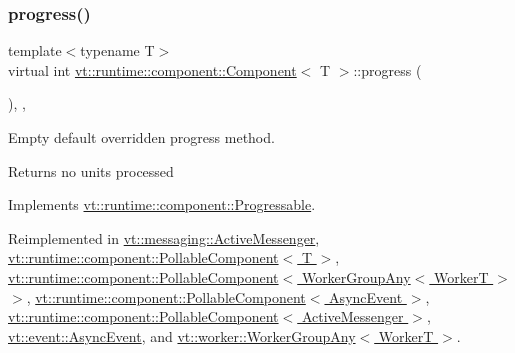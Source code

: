 \mbox{\label{structvt_1_1runtime_1_1component_1_1_component_a1dab11d9eb5bed8dfd5a3bb8fdf67f5a}} 
\subsubsection{\texorpdfstring{progress()}{progress()}}
{\footnotesize\ttfamily template$<$typename T$>$ \\
virtual int \hyperlink{structvt_1_1runtime_1_1component_1_1_component}{vt\+::runtime\+::component\+::\+Component}$<$ T $>$\+::progress (\begin{DoxyParamCaption}{ }\end{DoxyParamCaption})\hspace{0.3cm}{\ttfamily [inline]}, {\ttfamily [override]}, {\ttfamily [virtual]}}



Empty default overridden progress method. 

\begin{DoxyReturn}{Returns}
no units processed 
\end{DoxyReturn}


Implements \hyperlink{structvt_1_1runtime_1_1component_1_1_progressable_a37e883d4822db4f1effa9587b9f1160d}{vt\+::runtime\+::component\+::\+Progressable}.



Reimplemented in \hyperlink{structvt_1_1messaging_1_1_active_messenger_a4cd83c125e144ecbd9425fa7cd194538}{vt\+::messaging\+::\+Active\+Messenger}, \hyperlink{structvt_1_1runtime_1_1component_1_1_pollable_component_a34cad810026224d550cd9b0c9d1eff22}{vt\+::runtime\+::component\+::\+Pollable\+Component$<$ T $>$}, \hyperlink{structvt_1_1runtime_1_1component_1_1_pollable_component_a34cad810026224d550cd9b0c9d1eff22}{vt\+::runtime\+::component\+::\+Pollable\+Component$<$ Worker\+Group\+Any$<$ Worker\+T $>$ $>$}, \hyperlink{structvt_1_1runtime_1_1component_1_1_pollable_component_a34cad810026224d550cd9b0c9d1eff22}{vt\+::runtime\+::component\+::\+Pollable\+Component$<$ Async\+Event $>$}, \hyperlink{structvt_1_1runtime_1_1component_1_1_pollable_component_a34cad810026224d550cd9b0c9d1eff22}{vt\+::runtime\+::component\+::\+Pollable\+Component$<$ Active\+Messenger $>$}, \hyperlink{structvt_1_1event_1_1_async_event_a36f18429bc2856a30c8f7fd70654e0a4}{vt\+::event\+::\+Async\+Event}, and \hyperlink{structvt_1_1worker_1_1_worker_group_any_a1a2d6dc321514501e00c0373f2583146}{vt\+::worker\+::\+Worker\+Group\+Any$<$ Worker\+T $>$}.

